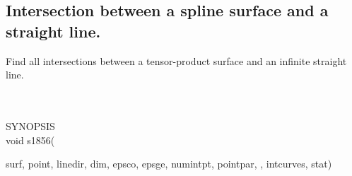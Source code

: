 \subsection{Intersection between a spline surface and a straight line.}
\begin{minipg1}
  Find all intersections between a tensor-product surface and an infinite straight
  line.
\end{minipg1} \\ \\
SYNOPSIS\\
        \>void s1856(\begin{minipg3}
                {\fov surf}, {\fov point}, {\fov linedir}, {\fov dim}, {\fov epsco}, {\fov epsge}, {\fov numintpt}, {\fov pointpar},
                , {\fov intcurves}, {\fov stat})
                \end{minipg3}\\[0.3ex]

